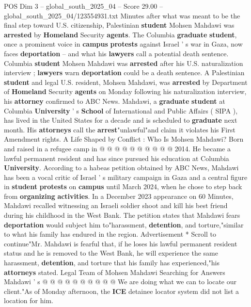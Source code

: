\begin{textsample}{POS Dim 3 – global\_south\_2025\_04 – Score 29.00 – global\_south\_2025\_04/123554931.txt}  \label{ex:f3_pos_111}
Minutes after what was meant to be the final step toward U.S. citizenship, Palestinian \textbf{student} Mohsen Mahdawi was \textbf{arrested} by \textbf{Homeland} Security \textbf{agents}.
The Columbia \textbf{graduate} \textbf{student}, once a prominent voice in \textbf{campus} \textbf{protests} against Israel ' s war in Gaza, now faces \textbf{deportation} -- and what his \textbf{lawyers} call a potential death sentence.
Columbia \textbf{student} Mohsen Mahdawi was \textbf{arrested} after his U.S. naturalization interview ; \textbf{lawyers} warn \textbf{deportation} could be a death sentence.
A Palestinian \textbf{student} and legal U.S. resident, Mohsen Mahdawi, was \textbf{arrested} by Department of \textbf{Homeland} Security \textbf{agents} on Monday following his naturalization interview, his \textbf{attorney} confirmed to ABC News.
Mahdawi, a \textbf{graduate} \textbf{student} at Columbia \textbf{University} ' s \textbf{School} of International and Public Affairs ( SIPA ), has lived in the United States for a decade and is scheduled to \textbf{graduate} next month.
His \textbf{attorneys} call the \textbf{arrest}"unlawful"and claim it violates his First Amendment rights.
A Life Shaped by Conflict : Who Is Mohsen Mahdawi?
Born and raised in a refugee camp in @ @ @ @ @ @ @ @ @ @ 2014.
He became a lawful permanent resident and has since pursued his education at Columbia \textbf{University}.
According to a habeas petition obtained by ABC News, Mahdawi has been a vocal critic of Israel ' s military campaign in Gaza and a central figure in \textbf{student} \textbf{protests} on \textbf{campus} until March 2024, when he chose to step back from \textbf{organizing} \textbf{activities}.
In a December 2023 appearance on 60 Minutes, Mahdawi recalled witnessing an Israeli soldier shoot and kill his best friend during his childhood in the West Bank.
The petition states that Mahdawi fears \textbf{deportation} would subject him to"harassment, \textbf{detention}, and torture,"similar to what his family has endured in the region.
Advertisement * Scroll to continue"Mr.
Mahdawi is fearful that, if he loses his lawful permanent resident status and he is removed to the West Bank, he will experience the same harassment, \textbf{detention}, and torture that his family has experienced,"his \textbf{attorneys} stated.
Legal Team of Mohsen Mahdawi Searching for Answers Mahdawi ' s @ @ @ @ @ @ @ @ @ @ We are doing what we can to locate our client."As of Monday afternoon, the \textbf{ICE} detainee locator system did not list a location for him.

\end{textsample}
